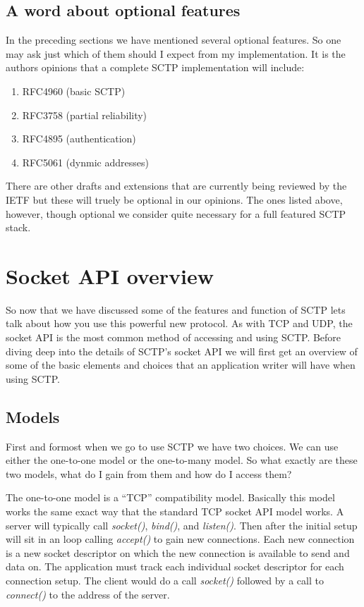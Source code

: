 \documentclass[conference]{IEEEtran}
\begin{document}
\subsection{A word about optional features}
\label{options}
In the preceding sections we have mentioned several optional
features. So one may ask just which of them should I expect from
my implementation. It is the authors opinions that a complete 
SCTP implementation will include:
\begin{enumerate}
 \item  RFC4960 (basic SCTP)
 \item  RFC3758 (partial reliability)
 \item  RFC4895 (authentication)
 \item  RFC5061 (dynmic addresses)
\end{enumerate}

There are other drafts and extensions that are currently being
reviewed by the IETF but these will truely be optional in our
opinions. The ones listed above, however, though optional we
consider quite necessary for a full featured SCTP stack.

\section{Socket API overview}
So now that we have discussed some of the features and function of SCTP lets
talk about how you use this powerful new protocol. As with TCP and UDP, the socket
API is the most common method of accessing and using SCTP. Before diving deep into
the details of SCTP's socket API we will first get an overview of some of the
basic elements and choices that an application writer will have when using
SCTP.

\subsection{Models}
First and formost when we go to use SCTP we have two choices. We can
use either the one-to-one model or the one-to-many model. So what exactly
are these two models, what do I gain from them and how do I access them?

The one-to-one model is a ``TCP'' compatibility model. Basically this model
works the same exact way that the standard TCP socket API model works.
A server will typically call \emph{socket()}, \emph{bind()}, and \emph{listen()}. Then after
the initial setup will sit in an loop calling \emph{accept()} to gain new connections.
Each new connection is a new socket descriptor on which the new
connection is available to send and data on. The application must track each individual socket
descriptor for each connection setup.  The client would do a call \emph{socket()}  followed by a call to \emph{connect()} to the
address of the server. 
\end{document}
